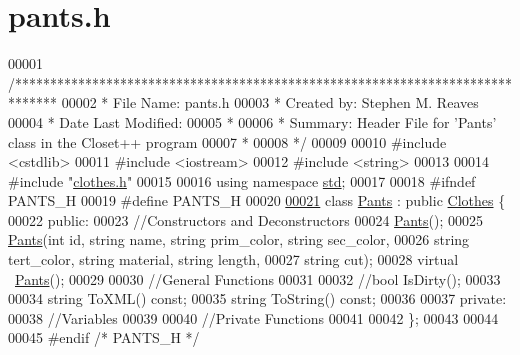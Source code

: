 \hypertarget{pants_8h_source}{}\section{pants.\+h}

\begin{DoxyCode}
00001 \textcolor{comment}{/******************************************************************************}
00002 \textcolor{comment}{ * File Name: pants.h}
00003 \textcolor{comment}{ * Created by: Stephen M. Reaves}
00004 \textcolor{comment}{ * Date Last Modified:}
00005 \textcolor{comment}{ *}
00006 \textcolor{comment}{ * Summary: Header File for 'Pants' class in the Closet++ program}
00007 \textcolor{comment}{ *}
00008 \textcolor{comment}{ */}
00009 
00010 \textcolor{preprocessor}{#include <cstdlib>}
00011 \textcolor{preprocessor}{#include <iostream>}
00012 \textcolor{preprocessor}{#include <string>}
00013 
00014 \textcolor{preprocessor}{#include "\mbox{\hyperlink{clothes_8h}{clothes.h}}"}
00015 
00016 \textcolor{keyword}{using namespace }\mbox{\hyperlink{namespacestd}{std}};
00017 
00018 \textcolor{preprocessor}{#ifndef PANTS\_H}
00019 \textcolor{preprocessor}{#define PANTS\_H}
00020 
\mbox{\hyperlink{classPants}{00021}} \textcolor{keyword}{class }\mbox{\hyperlink{classPants}{Pants}} : \textcolor{keyword}{public} \mbox{\hyperlink{classClothes}{Clothes}} \{
00022   \textcolor{keyword}{public}:
00023     \textcolor{comment}{//Constructors and Deconstructors}
00024     \mbox{\hyperlink{classPants}{Pants}}();
00025     \mbox{\hyperlink{classPants}{Pants}}(\textcolor{keywordtype}{int} \textcolor{keywordtype}{id}, \textcolor{keywordtype}{string} name, \textcolor{keywordtype}{string} prim\_color, \textcolor{keywordtype}{string} sec\_color, 
00026           \textcolor{keywordtype}{string} tert\_color, \textcolor{keywordtype}{string} material, \textcolor{keywordtype}{string} length, 
00027           \textcolor{keywordtype}{string} cut);
00028     \textcolor{keyword}{virtual} ~\mbox{\hyperlink{classPants}{Pants}}();
00029 
00030     \textcolor{comment}{//General Functions}
00031 
00032     \textcolor{comment}{//bool IsDirty();}
00033 
00034     \textcolor{keywordtype}{string} ToXML() \textcolor{keyword}{const};
00035     \textcolor{keywordtype}{string} ToString() \textcolor{keyword}{const};
00036   
00037   \textcolor{keyword}{private}:
00038     \textcolor{comment}{//Variables}
00039 
00040     \textcolor{comment}{//Private Functions}
00041 
00042 \};
00043 
00044 
00045 \textcolor{preprocessor}{#endif }\textcolor{comment}{/* PANTS\_H */}\textcolor{preprocessor}{ }
\end{DoxyCode}
